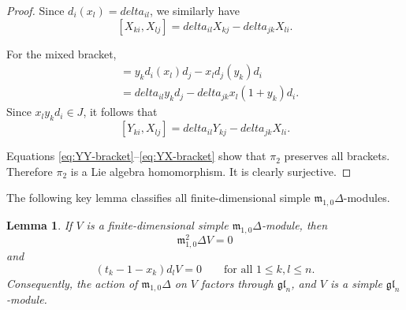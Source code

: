 \documentclass[12pt,a4paper]{amsart}
\def\delta{delta}%
\newtheorem{lemma}[theorem]{Lemma}%
\numberwithin{equation}{section}
\begin{document}
\begin{proof}
Since \(d_i(x_l)=\delta_{il}\), we similarly have
\begin{equation}\label{eq:XX-bracket}
[X_{ki},X_{lj}]
 =
 \delta_{il}X_{kj}-\delta_{jk}X_{li}.
\end{equation}

For the mixed bracket,
\begin{align*}
[y_kd_i,x_ld_j]
&=
y_kd_i(x_l)d_j-x_ld_j(y_k)d_i\\
&=
\delta_{il}y_kd_j-\delta_{jk}x_l(1+y_k)d_i.
\end{align*}
Since \(x_ly_kd_i\in J\), it follows that
\begin{equation}\label{eq:YX-bracket}
[Y_{ki},X_{lj}]
 =
 \delta_{il}Y_{kj}-\delta_{jk}X_{li}.
\end{equation}

Equations \eqref{eq:YY-bracket}--\eqref{eq:YX-bracket} show that
\(\pi_2\) preserves all brackets. Therefore \(\pi_2\) is a Lie
algebra homomorphism. It is clearly surjective.
\end{proof}

The following key lemma classifies all finite-dimensional
simple \(\mathfrak m_{1,0}\Delta\)-modules.

\begin{lemma}\label{lem:gln-quotient}
If \(V\) is a finite-dimensional simple
\(\mathfrak m_{1,0}\Delta\)-module, then
\[
\mathfrak m_{1,0}^{2}\Delta V=0
\]
and
\[
(t_k-1-x_k)d_lV=0
\qquad
\text{for all }1\leq k,l\leq n.
\]
Consequently, the action of \(\mathfrak m_{1,0}\Delta\) on \(V\)
factors through \(\mathfrak{gl}_n\), and \(V\) is a simple
\(\mathfrak{gl}_n\)-module.
\end{lemma}
\end{document}
